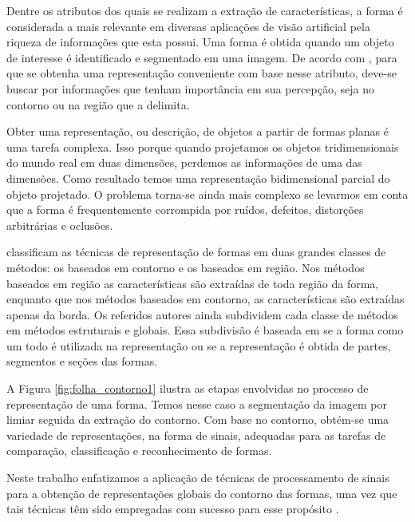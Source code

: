 Dentre os atributos dos quais se realizam a extração de características, a forma é considerada a mais relevante em diversas aplicações de visão artificial pela riqueza de informações que esta possui. Uma forma é obtida quando um objeto de interesse é identificado e segmentado em uma imagem. 
 De acordo com , para que se obtenha uma representação conveniente com base nesse atributo, deve-se buscar por informações que tenham importância em sua percepção, seja no contorno ou na região que a delimita. 

Obter uma representação, ou descrição, de objetos a partir de formas planas é uma tarefa complexa. Isso porque quando projetamos os objetos tridimensionais do mundo real em duas dimensões, perdemos as informações de uma das dimensões. Como resultado temos uma representação bidimensional parcial do objeto projetado. O problema torna-se ainda mais complexo se levarmos em conta que a forma é frequentemente corrompida por ruídos, defeitos, distorções arbitrárias e oclusões.

 classificam as técnicas de representação de formas em duas grandes classes de métodos: os baseados em contorno e os baseados em região. Nos métodos baseados em região as características são extraídas de toda região da forma, enquanto que nos métodos baseados em contorno, as características são extraídas apenas da borda. Os referidos autores ainda subdividem cada classe de métodos em métodos estruturais e globais. Essa subdivisão é baseada em se a forma como um todo é utilizada na representação ou se a representação é obtida de partes, segmentos e seções das formas. 

A Figura \ref{fig:folha_contorno1} ilustra as etapas envolvidas no processo de representação de uma forma. Temos nesse caso a segmentação da imagem por limiar seguida da extração do contorno. Com base no contorno, obtém-se uma variedade de representações, na forma de sinais, adequadas para as tarefas de comparação, classificação e reconhecimento de formas.

Neste trabalho  enfatizamos a aplicação de técnicas de processamento de sinais para a obtenção de representações globais do contorno das formas, uma vez que tais técnicas têm sido empregadas com sucesso para esse propósito \cite{Costa:2009}. 

\begin{comment}
Técnicas baseadas em contorno de formas exploram apenas a região da borda da forma. Há dois tipos de abordagens para extração de características do contorno das formas: global e estrutural. Na abordagem global a forma não é dividida em sub-partes e um vetor de características que representa toda a borda é obtido para representar a forma. Na abordagem estrutural a borda da forma é particionada em segmentos, denominados de primitivas mediante algum critério. A representação final é geralmente uma cadeia de caracteres, um grafo ou uma árvore.
\end{comment}




